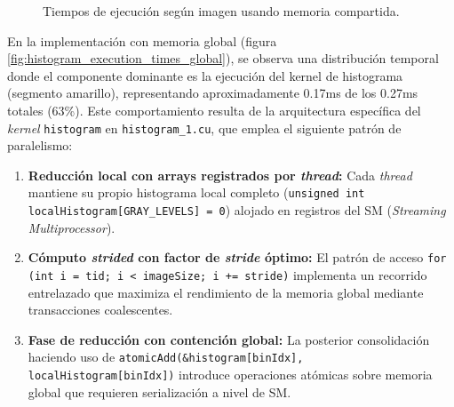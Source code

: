         \begin{figure}[H]
            \centering
            \caption{Tiempos de ejecución según imagen usando memoria compartida.}
            \label{fig:histogram_execution_times_shared}
        \end{figure}

        En la implementación con memoria global (figura \ref{fig:histogram_execution_times_global}), se observa una distribución temporal donde el componente dominante es la ejecución del kernel de histograma (segmento amarillo), representando aproximadamente 0.17ms de los 0.27ms totales (63\%). Este comportamiento resulta de la arquitectura específica del \textit{kernel} \texttt{histogram} en \texttt{histogram\_1.cu}, que emplea el siguiente patrón de paralelismo:

        \begin{enumerate}

            \item \textbf{Reducción local con arrays registrados por \textit{thread}:} Cada \textit{thread} mantiene su propio histograma local completo (\texttt{unsigned int localHistogram[GRAY\_LEVELS] = {0}}) alojado en registros del SM (\textit{Streaming Multiprocessor}). 
            
            \item \textbf{Cómputo \textit{strided} con factor de \textit{stride} óptimo:} El patrón de acceso \texttt{for (int i = tid; i < imageSize; i += stride)} implementa un recorrido entrelazado que maximiza el rendimiento de la memoria global mediante transacciones coalescentes.
    
            \item \textbf{Fase de reducción con contención global:} La posterior consolidación haciendo uso de \texttt{atomicAdd(\&histogram[binIdx], localHistogram[binIdx])} introduce operaciones atómicas sobre memoria global que requieren serialización a nivel de SM.

        \end{enumerate}

